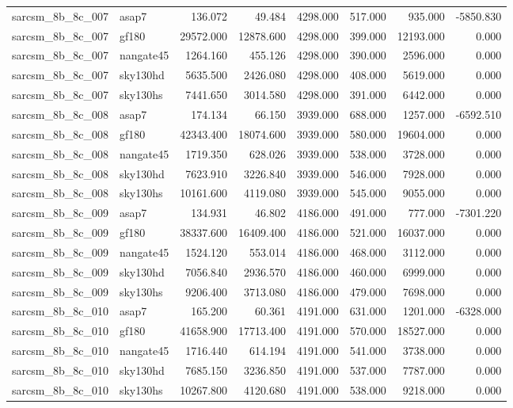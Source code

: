 \begin{tabular}{llrrrrrr}
sarcsm\_8b\_8c\_007 & asap7 & 136.072 & 49.484 & 4298.000 & 517.000 & 935.000 & -5850.830 \\
sarcsm\_8b\_8c\_007 & gf180 & 29572.000 & 12878.600 & 4298.000 & 399.000 & 12193.000 & 0.000 \\
sarcsm\_8b\_8c\_007 & nangate45 & 1264.160 & 455.126 & 4298.000 & 390.000 & 2596.000 & 0.000 \\
sarcsm\_8b\_8c\_007 & sky130hd & 5635.500 & 2426.080 & 4298.000 & 408.000 & 5619.000 & 0.000 \\
sarcsm\_8b\_8c\_007 & sky130hs & 7441.650 & 3014.580 & 4298.000 & 391.000 & 6442.000 & 0.000 \\
sarcsm\_8b\_8c\_008 & asap7 & 174.134 & 66.150 & 3939.000 & 688.000 & 1257.000 & -6592.510 \\
sarcsm\_8b\_8c\_008 & gf180 & 42343.400 & 18074.600 & 3939.000 & 580.000 & 19604.000 & 0.000 \\
sarcsm\_8b\_8c\_008 & nangate45 & 1719.350 & 628.026 & 3939.000 & 538.000 & 3728.000 & 0.000 \\
sarcsm\_8b\_8c\_008 & sky130hd & 7623.910 & 3226.840 & 3939.000 & 546.000 & 7928.000 & 0.000 \\
sarcsm\_8b\_8c\_008 & sky130hs & 10161.600 & 4119.080 & 3939.000 & 545.000 & 9055.000 & 0.000 \\
sarcsm\_8b\_8c\_009 & asap7 & 134.931 & 46.802 & 4186.000 & 491.000 & 777.000 & -7301.220 \\
sarcsm\_8b\_8c\_009 & gf180 & 38337.600 & 16409.400 & 4186.000 & 521.000 & 16037.000 & 0.000 \\
sarcsm\_8b\_8c\_009 & nangate45 & 1524.120 & 553.014 & 4186.000 & 468.000 & 3112.000 & 0.000 \\
sarcsm\_8b\_8c\_009 & sky130hd & 7056.840 & 2936.570 & 4186.000 & 460.000 & 6999.000 & 0.000 \\
sarcsm\_8b\_8c\_009 & sky130hs & 9206.400 & 3713.080 & 4186.000 & 479.000 & 7698.000 & 0.000 \\
sarcsm\_8b\_8c\_010 & asap7 & 165.200 & 60.361 & 4191.000 & 631.000 & 1201.000 & -6328.000 \\
sarcsm\_8b\_8c\_010 & gf180 & 41658.900 & 17713.400 & 4191.000 & 570.000 & 18527.000 & 0.000 \\
sarcsm\_8b\_8c\_010 & nangate45 & 1716.440 & 614.194 & 4191.000 & 541.000 & 3738.000 & 0.000 \\
sarcsm\_8b\_8c\_010 & sky130hd & 7685.150 & 3236.850 & 4191.000 & 537.000 & 7787.000 & 0.000 \\
sarcsm\_8b\_8c\_010 & sky130hs & 10267.800 & 4120.680 & 4191.000 & 538.000 & 9218.000 & 0.000 \\

\end{tabular}
